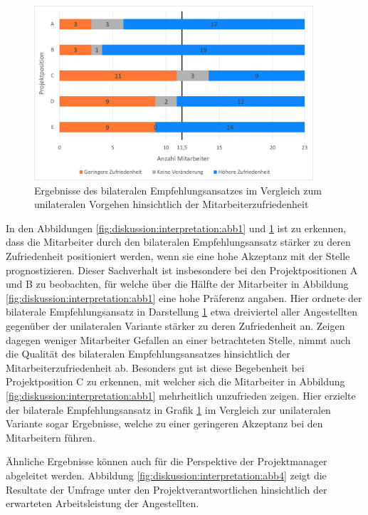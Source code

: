 \begin{figure}[h]
	\centering
	\includegraphics[width=0.925\textwidth]{gfx/zufriedenheit-projekte.png}	
	\caption{Ergebnisse des bilateralen Empfehlungsansatzes im Vergleich zum unilateralen Vorgehen hinsichtlich der Mitarbeiterzufriedenheit}
	\label{fig:diskussion:interpretation:abb3}
\end{figure}

In den Abbildungen \ref{fig:diskussion:interpretation:abb1} und \ref{fig:diskussion:interpretation:abb3} ist zu erkennen, dass die Mitarbeiter durch den bilateralen Empfehlungsansatz stärker zu deren Zufriedenheit positioniert werden, wenn sie eine hohe Akzeptanz mit der Stelle prognostizieren. Dieser Sachverhalt ist insbesondere bei den Projektpositionen A und B zu beobachten, für welche über die Hälfte der Mitarbeiter in Abbildung \ref{fig:diskussion:interpretation:abb1} eine hohe Präferenz angaben. Hier ordnete der bilaterale Empfehlungsansatz in Darstellung \ref{fig:diskussion:interpretation:abb3} etwa dreiviertel aller Angestellten gegenüber der unilateralen Variante stärker zu deren Zufriedenheit an. Zeigen dagegen weniger Mitarbeiter Gefallen an einer betrachteten Stelle, nimmt auch die Qualität des bilateralen Empfehlungsansatzes hinsichtlich der Mitarbeiterzufriedenheit ab. Besonders gut ist diese Begebenheit bei Projektposition C zu erkennen, mit welcher sich die Mitarbeiter in Abbildung \ref{fig:diskussion:interpretation:abb1} mehrheitlich unzufrieden zeigen. Hier erzielte der bilaterale Empfehlungsansatz in Grafik \ref{fig:diskussion:interpretation:abb3} im Vergleich zur unilateralen Variante sogar Ergebnisse, welche zu einer geringeren Akzeptanz bei den Mitarbeitern führen.

Ähnliche Ergebnisse können auch für die Perspektive der Projektmanager abgeleitet werden. Abbildung \ref{fig:diskussion:interpretation:abb4} zeigt die Resultate der Umfrage unter den Projektverantwortlichen hinsichtlich der erwarteten Arbeitsleistung der Angestellten.

